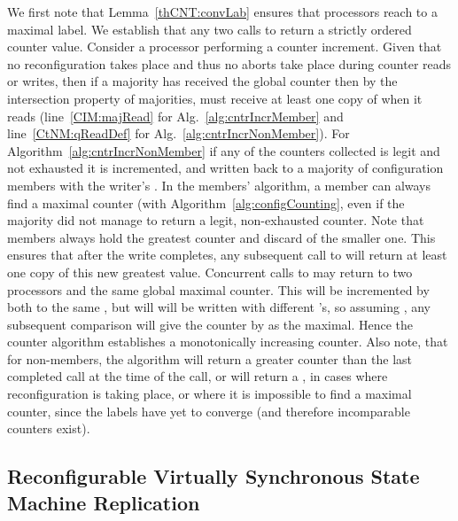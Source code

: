 \documentclass[11pt]{article}
\newenvironment{proof}{\noindent{\bf Proof.}}{\hfill}
\begin{document}
\begin{proof}
We first note that Lemma~\ref{thCNT:convLab} ensures that processors reach to a maximal label.
We establish that any two calls to  return a strictly ordered counter value. 
Consider a processor  performing a counter increment.
Given that no reconfiguration takes place and thus no aborts take place during counter reads or writes, then if a majority has received the global counter  then by the intersection property of majorities,  must receive at least one copy of  when it reads (line~\ref{CIM:majRead} for Alg.~\ref{alg:cntrIncrMember} and line~\ref{CtNM:qReadDef} for Alg.~\ref{alg:cntrIncrNonMember}).
For Algorithm~\ref{alg:cntrIncrNonMember} if any of the counters collected is legit and not exhausted it is incremented, and written back to a majority of configuration members with the writer's .
In the members' algorithm, a member can always find a maximal counter (with Algorithm~\ref{alg:configCounting}, even if the majority did not manage to return a legit, non-exhausted counter.
Note that members always hold the greatest counter and discard of the smaller one. 
This ensures that after the write completes, any subsequent call to  will return at least one copy of this new greatest value. 
Concurrent calls to  may return to two processors  and  the same global maximal counter.
This will be incremented by both to the same , but will will be written with different 's, so assuming , any subsequent comparison will give the counter by  as the maximal.
Hence the counter algorithm establishes a monotonically increasing counter.
Also note, that for non-members, the algorithm will return a greater counter than the last completed call at the time of the call, or will return a , in cases where reconfiguration is taking place, or where it is impossible to find a maximal counter, since the labels have yet to converge (and therefore incomparable counters exist).
\end{proof}





\subsection{Reconfigurable Virtually Synchronous State Machine Replication} 
\label{sec:VS}
\end{document}
